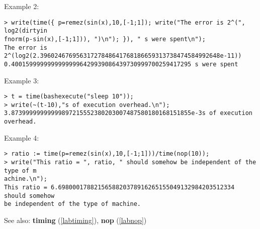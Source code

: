 \noindent Example 2: 
\begin{center}\begin{minipage}{15cm}\begin{Verbatim}[frame=single]
> write(time({ p=remez(sin(x),10,[-1;1]); write("The error is 2^(", log2(dirtyin
fnorm(p-sin(x),[-1;1])), ")\n"); }), " s were spent\n");
The error is 2^(log2(2.39602467695631727848641768186659313738474584992648e-11))
0.40015999999999999996429939086439730999700259417295 s were spent
\end{Verbatim}
\end{minipage}\end{center}
\noindent Example 3: 
\begin{center}\begin{minipage}{15cm}\begin{Verbatim}[frame=single]
> t = time(bashexecute("sleep 10"));
> write(~(t-10),"s of execution overhead.\n");
3.87399999999999897215552380203007487580180168151855e-3s of execution overhead.
\end{Verbatim}
\end{minipage}\end{center}
\noindent Example 4: 
\begin{center}\begin{minipage}{15cm}\begin{Verbatim}[frame=single]
> ratio := time(p=remez(sin(x),10,[-1;1]))/time(nop(10));
> write("This ratio = ", ratio, " should somehow be independent of the type of m
achine.\n");
This ratio = 6.6980001788215658820378916265155049132984203512334 should somehow 
be independent of the type of machine.
\end{Verbatim}
\end{minipage}\end{center}
See also: \textbf{timing} (\ref{labtiming}), \textbf{nop} (\ref{labnop})
